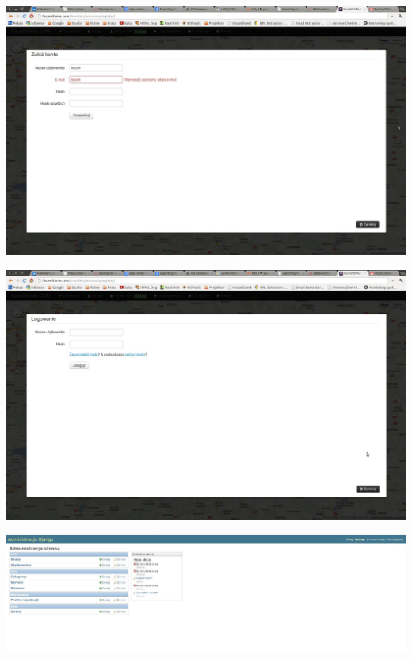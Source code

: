 \begin{center}
    \includegraphics[width=\textwidth]{img/screens/interfejs_www/rejestracja.jpg}
    \label{fig:rejestracja}
\end{center}
\begin{center}
    \includegraphics[width=\textwidth]{img/screens/interfejs_www/logowanie.jpg}
    \label{fig:logowanie}
\end{center}
\begin{center}
    \includegraphics[width=\textwidth]{img/screens/interfejs_www/panel-administracyjny.jpg}
    \label{fig:panelAdministracyjny}
\end{center}
